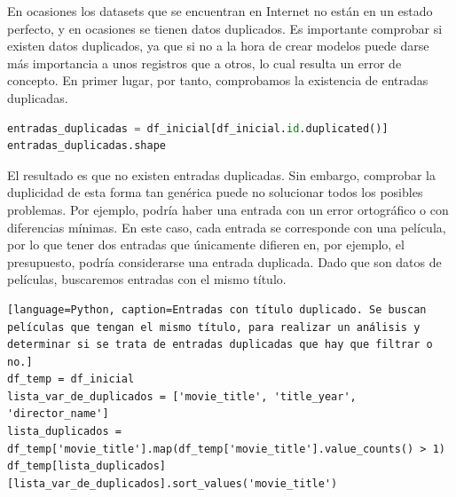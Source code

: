 En ocasiones los datasets que se encuentran en Internet no están en un estado perfecto, y en ocasiones se tienen datos duplicados. Es importante comprobar si existen datos duplicados, ya que si no a la hora de crear modelos puede darse más importancia a unos registros que a otros, lo cual resulta un error de concepto. En primer lugar, por tanto, comprobamos la existencia de entradas duplicadas.
\begin{lstlisting}[language=Python, caption=Entradas duplicadas. Se buscan entradas duplicadas a partir del id de la película y se devuelve la canditdad de películas repetidas.]
entradas_duplicadas = df_inicial[df_inicial.id.duplicated()]
entradas_duplicadas.shape
\end{lstlisting}
El resultado es que no existen entradas duplicadas. Sin embargo, comprobar la duplicidad de esta forma tan genérica puede no solucionar todos los posibles problemas. Por ejemplo, podría haber una entrada con un error ortográfico o con diferencias mínimas. En este caso, cada entrada se corresponde con una película, por lo que tener dos entradas que únicamente difieren en, por ejemplo, el presupuesto, podría considerarse una entrada duplicada. Dado que son datos de películas, buscaremos entradas con el mismo título. 

\begin{lstlisting}[language=Python, caption=Entradas con título duplicado. Se buscan películas que tengan el mismo título, para realizar un análisis y determinar si se trata de entradas duplicadas que hay que filtrar o no.]
df_temp = df_inicial
lista_var_de_duplicados = ['movie_title', 'title_year', 'director_name']
lista_duplicados = df_temp['movie_title'].map(df_temp['movie_title'].value_counts() > 1)
df_temp[lista_duplicados][lista_var_de_duplicados].sort_values('movie_title')
\end{lstlisting}


